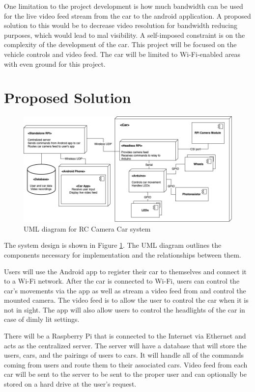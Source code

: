 \documentclass[letterpaper,12pt]{report}
\begin{document}
	One limitation to the project development is how much bandwidth can be used
	for the live video feed stream from the car to the android application. A
	proposed solution to this would be to decrease video resolution for
	bandwidth reducing purposes, which would lead to mal visibility. A
	self-imposed constraint is on the complexity of the development of the car.
	This project will be focused on the vehicle controls and video feed. The car
	will be limited to Wi-Fi-enabled areas with even ground for this project.

	\section*{Proposed Solution}
	\markright{}

	\begin{figure}[H]
    	\centering
		\includegraphics[width=\linewidth]{Proposal_UML_Diagram.png}
    	\caption{UML diagram for RC Camera Car system}
    	\label{fig:uml}
	\end{figure}

	The system design is shown in Figure \ref{fig:uml}. The UML diagram outlines
	the components necessary for implementation and the relationships between
	them. 

	Users will use the Android app to register their car to themselves and
	connect it to a Wi-Fi network. After the car is connected to Wi-Fi, users
	can control the car’s movements via the app as well as stream a video feed
	from and control the mounted camera. The video feed is to allow the user to
	control the car when it is not in sight. The app will also allow users to
	control the headlights of the car in case of dimly lit settings.

	There will be a Raspberry Pi that is connected to the Internet via Ethernet
	and acts as the centralized server. The server will have a database that
	will store the users, cars, and the pairings of users to cars. It will
	handle all of the commands coming from users and route them to their
	associated cars. Video feed from each car will be sent to the server to be
	sent to the proper user and can optionally be stored on a hard drive at the
	user’s request.
\end{document}
